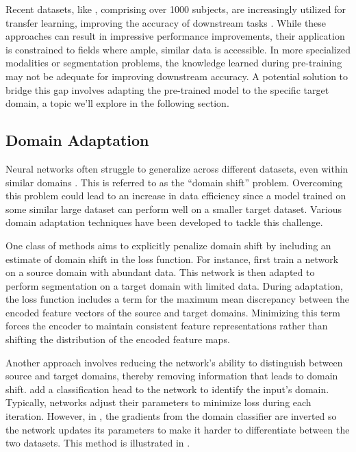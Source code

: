 Recent datasets, like \citet{wasserthalTotalSegmentatorRobustSegmentation2023}, comprising over 1000 subjects, are increasingly utilized for transfer learning, improving the accuracy of downstream tasks \cite{monaiconsortiumMONAIMedicalOpen2023, myronenkoAutomated3DSegmentation2023}. While these approaches can result in impressive performance improvements, their application is constrained to fields where ample, similar data is accessible. In more specialized modalities or segmentation problems, the knowledge learned during pre-training may not be adequate for improving downstream accuracy.  A potential solution to bridge this gap involves adapting the pre-trained model to the specific target domain, a topic we'll explore in the following section.

	\subsection{Domain Adaptation}
	
Neural networks often struggle to generalize across different datasets, even within similar domains \cite{torralbaUnbiasedLookDataset2011}. This is referred to as the ``domain shift'' problem. Overcoming this problem could lead to an increase in data efficiency since a model trained on some similar large dataset can perform well on a smaller target dataset. Various domain adaptation techniques have been developed to tackle this challenge.

One class of methods aims to explicitly penalize domain shift by including an estimate of domain shift in the loss function. For instance, \citet{liuUnsupervisedDeepDomain2018} first train a network on a source domain with abundant data. This network is then adapted to perform segmentation on a target domain with limited data. During adaptation, the loss function includes a term for the maximum mean discrepancy between the encoded feature vectors of the source and target domains. Minimizing this term forces the encoder to maintain consistent feature representations rather than shifting the distribution of the encoded feature maps.

Another approach involves reducing the network's ability to distinguish between source and target domains, thereby removing information that leads to domain shift. \citet{ganinDA2015} add a classification head to the network to identify the input's domain. Typically, networks adjust their parameters to minimize loss during each iteration. However, in \cite{ganinDA2015}, the gradients from the domain classifier are inverted so the network updates its parameters to make it harder to differentiate between the two datasets. This method is illustrated in .

